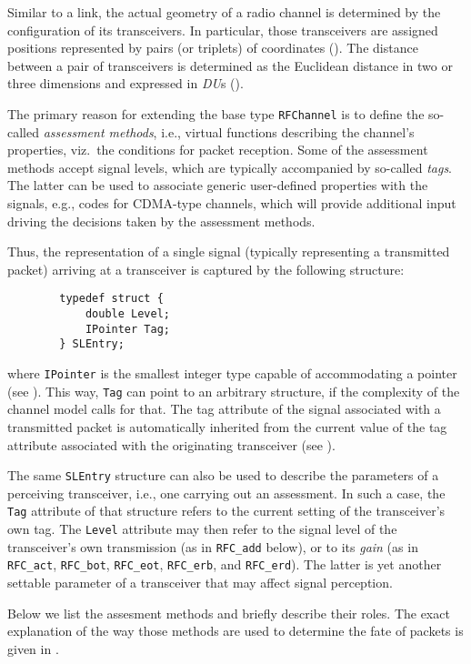 \medskip

Similar to a link, the actual geometry of a radio channel is determined by
the configuration of its transceivers.
In particular, those transceivers are assigned positions represented by
pairs (or triplets) of coordinates ().
The distance between a pair of transceivers
is determined as the Euclidean distance
in two or three dimensions and expressed in {\em DU\/}s ().

The primary reason for extending the base type {\tt RFChannel} is to define
the so-called {\em assessment methods}, i.e.,
virtual functions describing the channel's properties, viz.\ the
conditions for packet reception.
Some of the assessment
methods accept signal levels, which are typically accompanied by
so-called {\em tags}.
The latter can be used to associate generic user-defined
properties with the signals, e.g., codes for CDMA-type channels, which will
provide additional input driving the decisions taken by the assessment
methods.

Thus, the representation of a single signal (typically representing a
transmitted packet) arriving at a transceiver is captured by the
following structure:
\begin{verbatim}
        typedef struct {
            double Level;
            IPointer Tag;
        } SLEntry;
\end{verbatim}
\noindent
where {\tt IPointer} is the smallest integer type capable of accommodating
a pointer (see ).
This way, {\tt Tag\/} can point to an arbitrary structure, if the complexity
of the channel model calls for that.
The tag attribute of the signal associated with a transmitted packet is
automatically inherited from the current value of the tag attribute
associated with the originating transceiver (see ).

The same {\tt SLEntry} structure can also be used to describe the parameters
of a perceiving transceiver, i.e., one carrying out an assessment.
In such a case, the {\tt Tag} attribute of that structure refers to the
current setting of the transceiver's own tag.
The {\tt Level} attribute may then refer to the signal level of the
transceiver's own transmission (as in {\tt RFC\_add} below), or to its
{\em gain\/} (as in {\tt RFC\_act}, {\tt RFC\_bot}, {\tt RFC\_eot},
{\tt RFC\_erb}, and {\tt RFC\_erd}).
The latter is yet another settable parameter of a transceiver that may
affect signal perception.

Below we list the assesment methods and briefly describe their roles.
The exact explanation of the way those methods are used to determine the
fate of packets is given in .

